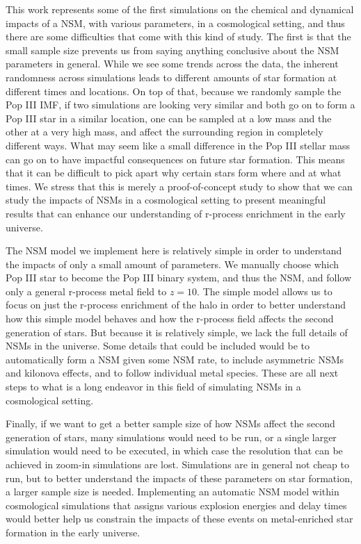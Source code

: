 \documentclass[fleqn,usenatbib]{mnras}
\begin{document}
This work represents some of the first simulations on the chemical and dynamical impacts of a NSM, with various parameters, in a cosmological setting, and thus there are some difficulties that come with this kind of study. The first is that the small sample size prevents us from saying anything conclusive about the NSM parameters in general. While we see some trends across the data, the inherent randomness across simulations leads to different amounts of star formation at different times and locations. On top of that, because we randomly sample the Pop III IMF, if two simulations are looking very similar and both go on to form a Pop III star in a similar location, one can be sampled at a low mass and the other at a very high mass, and affect the surrounding region in completely different ways. What may seem like a small difference in the Pop III stellar mass can go on to have impactful consequences on future star formation. This means that it can be difficult to pick apart why certain stars form where and at what times. We stress that this is merely a proof-of-concept study to show that we can study the impacts of NSMs in a cosmological setting to present meaningful results that can enhance our understanding of r-process enrichment in the early universe. 

The NSM model we implement here is relatively simple in order to understand the impacts of only a small amount of parameters. We manually choose which Pop III star to become the Pop III binary system, and thus the NSM, and follow only a general r-process metal field to $z = 10$. The simple model allows us to focus on just the r-process enrichment of the halo in order to better understand how this simple model behaves and how the r-process field affects the second generation of stars. But because it is relatively simple, we lack the full details of NSMs in the universe. Some details that could be included would be to automatically form a NSM given some NSM rate, to include asymmetric NSMs and kilonova effects, and to follow individual metal species. These are all next steps to what is a long endeavor in this field of simulating NSMs in a cosmological setting. 

Finally, if we want to get a better sample size of how NSMs affect the second generation of stars, many simulations would need to be run, or a single larger simulation would need to be executed, in which case the resolution that can be achieved in zoom-in simulations are lost. Simulations are in general not cheap to run, but to better understand the impacts of these parameters on star formation, a larger sample size is needed. Implementing an automatic NSM model within cosmological simulations that assigns various explosion energies and delay times would better help us constrain the impacts of these events on metal-enriched star formation in the early universe.
	
\end{document}
